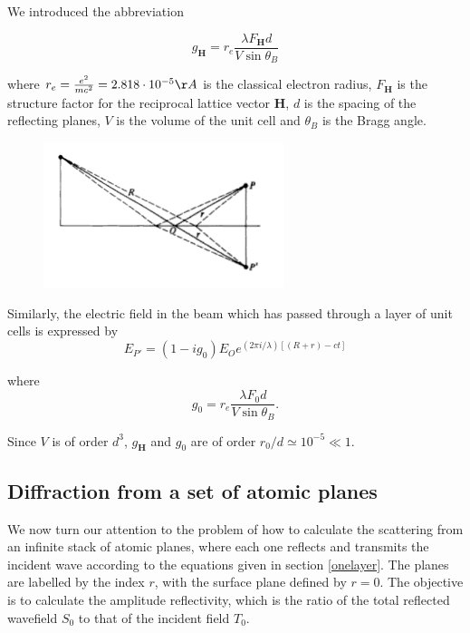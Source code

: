 \documentclass[12pt,oneside,notitlepage,abstracton,a4paper]{scrartcl}
\begin{document}
We introduced the abbreviation

\begin{equation}\label{eqg}
 g_\mathbf{H}=r_e\frac{\lambda F_\mathbf{H}d}{V \sin{\theta_B}}
\end{equation}

where $r_e=\frac{e^2}{mc^2}=2.818 \cdot 10^{-5} \AA{}$ is the classical electron radius, $F_\mathbf{H}$ is the structure factor for the reciprocal lattice vector $\mathbf{H}$, $d$ is the spacing of the reflecting planes, $V$ is the volume of the unit cell and $\theta_B$ is the Bragg angle.

\begin{figure}[h]
\begin{center}
\includegraphics[width=7cm]{pics/picture2.png}
\caption{}
\label{pic2}
\end{center}
\end{figure}


Similarly, the electric field in the beam which has passed through a layer of unit cells is expressed by
\begin{equation}\label{Et}
 E_{P'}=(1-ig_0)E_Oe^{(2\pi i /\lambda)[(R+r)-ct]}
\end{equation}

where
\begin{equation} \label{eqg0}
 g_0=r_e\frac{\lambda F_0 d}{V \sin{\theta_B}}.
\end{equation}

Since $V$ is of order $d^3$, $g_\mathbf{H}$ and $g_0$ are of order $r_0/d \simeq 10^{-5} \ll 1$.

\subsection{Diffraction from a set of atomic planes}
We now turn our attention to the problem of how to calculate the scattering from an infinite stack of atomic planes, where each one reflects and transmits the incident wave according to the equations given in section \ref{onelayer}. The planes are labelled by the index $r$, with the surface plane defined by $r=0$. The objective is to calculate the amplitude reflectivity, which is the ratio of the total reflected wavefield $S_0$ to that of the incident field $T_0$.
\end{document}
